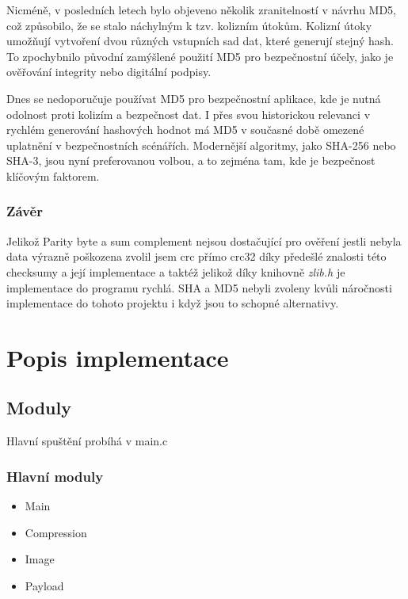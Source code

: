 \documentclass[12pt]{report}
\begin{document}
    Nicméně, v posledních letech bylo objeveno několik zranitelností v návrhu MD5, což způsobilo, že se stalo náchylným k tzv. kolizním útokům. Kolizní útoky umožňují vytvoření dvou různých vstupních sad dat, které generují stejný hash. To zpochybnilo původní zamýšlené použití MD5 pro bezpečnostní účely, jako je ověřování integrity nebo digitální podpisy.

    Dnes se nedoporučuje používat MD5 pro bezpečnostní aplikace, kde je nutná odolnost proti kolizím a bezpečnost dat. I přes svou historickou relevanci v rychlém generování hashových hodnot má MD5 v současné době omezené uplatnění v bezpečnostních scénářích. Modernější algoritmy, jako SHA-256 nebo SHA-3, jsou nyní preferovanou volbou, a to zejména tam, kde je bezpečnost klíčovým faktorem.
    \cite{MD5Wikip50:online}

\subsection{Závěr}
    Jelikož Parity byte a sum complement nejsou dostačující pro ověření jestli nebyla data výrazně poškozena zvolil jsem crc přímo crc32 díky předešlé znalosti této checksumy a její implementace a taktéž jelikož díky knihovně \textit{zlib.h} je implementace do programu rychlá. SHA a MD5 nebyli zvoleny kvůli náročnosti implementace do tohoto projektu i když jsou to schopné alternativy.




    \chapter{Popis implementace}
 
\section{   Moduly}
    Hlavní spuštění probíhá v main.c
    
   
\subsection{Hlavní moduly}
    \begin{itemize}
        \item Main
        \item Compression
        \item Image
        \item Payload
    \end{itemize}
\end{document}
